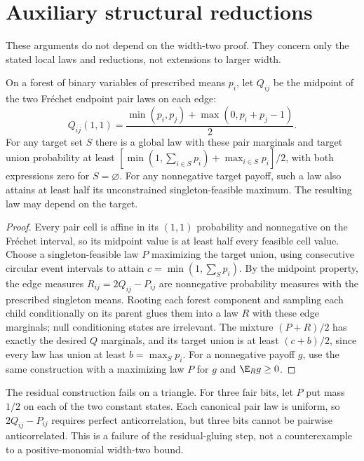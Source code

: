 \section{Auxiliary structural reductions}\label{app:structural-auxiliary}
These arguments do not depend on the width-two proof. They concern only
the stated local laws and reductions, not extensions to larger width.

\begin{lemma}\label{lem:canonical-pairs}
On a forest of binary variables of prescribed means $p_i$, let $Q_{ij}$
be the midpoint of the two Fr\'echet endpoint pair laws on each edge:
\[
 Q_{ij}(1,1)=\frac{\min(p_i,p_j)+\max(0,p_i+p_j-1)}2.
\]
For any target set $S$ there is a global law with these pair marginals
and target union probability at least
$[\min(1,\sum_{i\in S}p_i)+\max_{i\in S}p_i]/2$, with both expressions
zero for $S=\varnothing$. For any nonnegative target payoff, such a law
also attains at least half its unconstrained singleton-feasible maximum.
The resulting law may depend on the target.
\end{lemma}
\begin{proof}
Every pair cell is affine in its $(1,1)$ probability and nonnegative
on the Fr\'echet interval, so its midpoint value is at least half every
feasible cell value. Choose a singleton-feasible law $P$ maximizing the
target union, using consecutive circular event intervals to attain
$c=\min(1,\sum_Sp_i)$. By the midpoint property, the edge measures
$R_{ij}=2Q_{ij}-P_{ij}$ are nonnegative probability measures with the
prescribed singleton means. Rooting each forest component and sampling
each child conditionally on its parent glues them into a law $R$ with
these edge marginals; null conditioning states are irrelevant. The
mixture $(P+R)/2$ has exactly the desired $Q$ marginals, and its target
union is at least $(c+b)/2$, since every law has union at least
$b=\max_Sp_i$. For a nonnegative payoff $g$, use the same construction
with a maximizing law $P$ for $g$ and $\E_Rg\ge0$.
\end{proof}
The residual construction fails on a triangle. For three fair bits,
let $P$ put mass $1/2$ on each of the two constant states. Each
canonical pair law is uniform, so $2Q_{ij}-P_{ij}$ requires perfect
anticorrelation, but three bits cannot be pairwise anticorrelated. This
is a failure of the residual-gluing step, not a counterexample to a
positive-monomial width-two bound.

